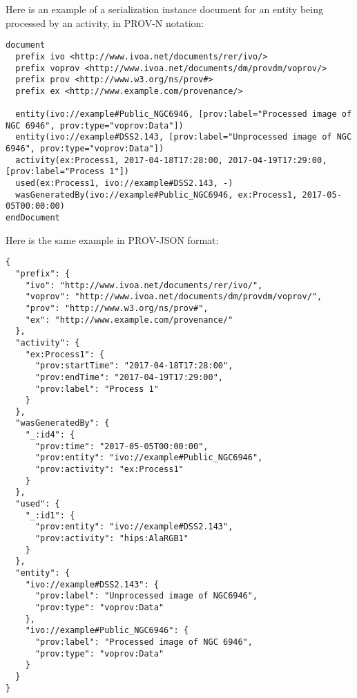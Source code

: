 

Here is an example of a serialization instance document for an entity being processed by an activity, in PROV-N notation:

\begin{verbatim}
document
  prefix ivo <http://www.ivoa.net/documents/rer/ivo/>
  prefix voprov <http://www.ivoa.net/documents/dm/provdm/voprov/>
  prefix prov <http://www.w3.org/ns/prov#>
  prefix ex <http://www.example.com/provenance/>

  entity(ivo://example#Public_NGC6946, [prov:label="Processed image of NGC 6946", prov:type="voprov:Data"])
  entity(ivo://example#DSS2.143, [prov:label="Unprocessed image of NGC 6946", prov:type="voprov:Data"])
  activity(ex:Process1, 2017-04-18T17:28:00, 2017-04-19T17:29:00, [prov:label="Process 1"])
  used(ex:Process1, ivo://example#DSS2.143, -)
  wasGeneratedBy(ivo://example#Public_NGC6946, ex:Process1, 2017-05-05T00:00:00)
endDocument
\end{verbatim}

\noindent
Here is the same example in PROV-JSON format:

\begin{verbatim}
{
  "prefix": {
    "ivo": "http://www.ivoa.net/documents/rer/ivo/",
    "voprov": "http://www.ivoa.net/documents/dm/provdm/voprov/",
    "prov": "http://www.w3.org/ns/prov#",
    "ex": "http://www.example.com/provenance/"
  },
  "activity": {
    "ex:Process1": {
      "prov:startTime": "2017-04-18T17:28:00",
      "prov:endTime": "2017-04-19T17:29:00",
      "prov:label": "Process 1"
    }
  },
  "wasGeneratedBy": {
    "_:id4": {
      "prov:time": "2017-05-05T00:00:00",
      "prov:entity": "ivo://example#Public_NGC6946",
      "prov:activity": "ex:Process1"
    }
  },
  "used": {
    "_:id1": {
      "prov:entity": "ivo://example#DSS2.143",
      "prov:activity": "hips:AlaRGB1"
    }
  },
  "entity": {
    "ivo://example#DSS2.143": {
      "prov:label": "Unprocessed image of NGC6946",
      "prov:type": "voprov:Data"
    },
    "ivo://example#Public_NGC6946": {
      "prov:label": "Processed image of NGC 6946",
      "prov:type": "voprov:Data"
    }
  }
}
\end{verbatim}

